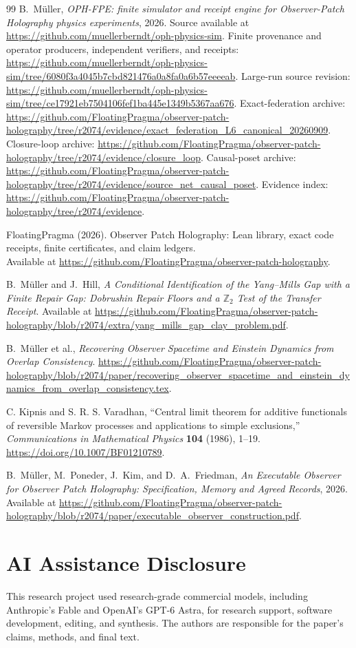 \documentclass[11pt]{article}
\theoremstyle{remark}
\theoremstyle{plain}
\begin{document}
\begin{thebibliography}{99}
B.\ M\"uller,
\emph{OPH-FPE: finite simulator and receipt engine for Observer-Patch
Holography physics experiments},
2026.
Source available at \url{https://github.com/muellerberndt/oph-physics-sim}.
Finite provenance and operator producers, independent verifiers, and receipts:
\url{https://github.com/muellerberndt/oph-physics-sim/tree/6080f3a4045b7cbd821476a0a8fa0a6b57eeeeab}.
Large-run source revision:
\url{https://github.com/muellerberndt/oph-physics-sim/tree/ce17921eb7504106fef1ba445e1349b5367aa676}.
Exact-federation archive:
\url{https://github.com/FloatingPragma/observer-patch-holography/tree/r2074/evidence/exact_federation_L6_canonical_20260909}.
Closure-loop archive:
\url{https://github.com/FloatingPragma/observer-patch-holography/tree/r2074/evidence/closure_loop}.
Causal-poset archive:
\url{https://github.com/FloatingPragma/observer-patch-holography/tree/r2074/evidence/source_net_causal_poset}.
Evidence index:
\url{https://github.com/FloatingPragma/observer-patch-holography/tree/r2074/evidence}.

FloatingPragma (2026). Observer Patch Holography: Lean library, exact code
receipts, finite certificates, and claim ledgers.\\
Available at \url{https://github.com/FloatingPragma/observer-patch-holography}.

B.\ M\"uller and J.\ Hill,
\emph{A Conditional Identification of the Yang--Mills Gap with a Finite Repair Gap: Dobrushin Repair Floors and a \(\mathbb Z_2\) Test of the Transfer Receipt}.
Available at \url{https://github.com/FloatingPragma/observer-patch-holography/blob/r2074/extra/yang_mills_gap_clay_problem.pdf}.

B.~M\"uller et al.,
\emph{Recovering Observer Spacetime and Einstein Dynamics from Overlap Consistency}.
\url{https://github.com/FloatingPragma/observer-patch-holography/blob/r2074/paper/recovering_observer_spacetime_and_einstein_dynamics_from_overlap_consistency.tex}.

C. Kipnis and S. R. S. Varadhan,
``Central limit theorem for additive functionals of reversible Markov
processes and applications to simple exclusions,''
\emph{Communications in Mathematical Physics} \textbf{104} (1986), 1--19.
\url{https://doi.org/10.1007/BF01210789}.

B.~M\"uller, M.~Poneder, J.~Kim, and D.~A.~Friedman,
\emph{An Executable Observer for Observer Patch Holography: Specification, Memory and Agreed Records},
2026.
Available at \url{https://github.com/FloatingPragma/observer-patch-holography/blob/r2074/paper/executable_observer_construction.pdf}.

\end{thebibliography}

\section*{AI Assistance Disclosure}
This research project used research-grade commercial models, including
Anthropic's Fable and OpenAI's GPT-6 Astra, for research support, software
development, editing, and synthesis. The authors are responsible for the
paper's claims, methods, and final text.
\end{document}
